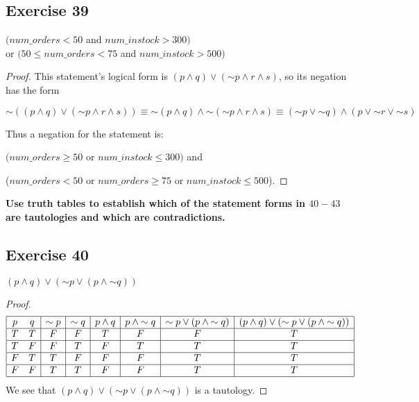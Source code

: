 \documentclass[14pt]{extarticle}
\begin{document}
\subsection{Exercise 39}
$(num\_orders < 50$ and $num\_instock > 300)$ \\
or $(50 \leq num\_orders < 75$ and $num\_instock > 500)$

\begin{proof}
    This statement’s logical form is $(p \wedge q) \vee ({\sim p}
        \wedge r \wedge s)$, so its negation has the form

    $$
        {\sim((p \wedge q) \vee ({\sim p} \wedge r \wedge s))} \equiv {\sim(p \wedge q)} \wedge {\sim({\sim p} \wedge r \wedge s)} \equiv ({\sim p} \vee {\sim q}) \wedge (p \vee {\sim r} \vee {\sim s})
    $$

    Thus a negation for the statement is:

    $(num\_orders \geq 50$ or $num\_instock \leq 300)$ and

    ($num\_orders < 50$ or $num\_orders \geq 75$ or $num\_instock \leq 500$).
\end{proof}

{\bf Use truth tables to establish which of the statement forms in $40-43$ are tautologies and which are contradictions.}

\subsection{Exercise 40}
$(p \wedge q) \vee ({\sim p} \vee (p \wedge {\sim q}))$

\begin{proof}
    $$
        \begin{array}{|cc|c|c|c|c|c|c|}
            \hline
            p & q & {\sim p} & {\sim q} & p \wedge q & p \wedge {\sim q} & {\sim p} \vee (p \wedge {\sim q}) & (p \wedge q) \vee ({\sim p} \vee (p \wedge {\sim q})) \\
            \hline
            T & T & F        & F        & T          & F                 & F                                 & T                                                     \\
            \hline
            T & F & F        & T        & F          & T                 & T                                 & T                                                     \\
            \hline
            F & T & T        & F        & F          & F                 & T                                 & T                                                     \\
            \hline
            F & F & T        & T        & F          & F                 & T                                 & T                                                     \\
            \hline
        \end{array}
    $$
    We see that $(p \wedge q) \vee ({\sim p} \vee (p \wedge {\sim q}))$ is a tautology.
\end{proof}
\end{document}
